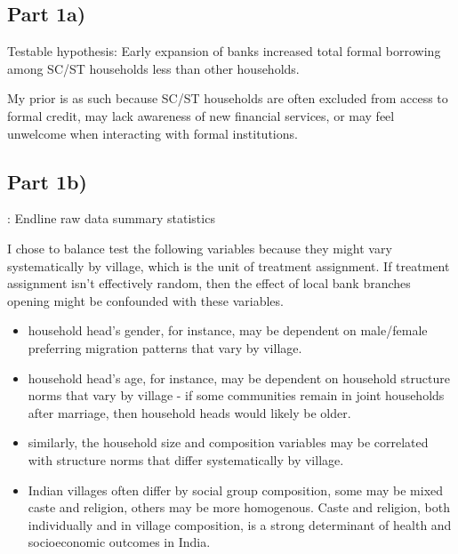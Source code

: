 \documentclass[12pt]{article}
\begin{document}
\subsection*{Part 1a)}

Testable hypothesis: Early expansion of banks increased total formal borrowing among SC/ST households less than other households. 

My prior is as such because SC/ST households are often excluded from access to formal credit, may lack awareness of new financial services, or may feel unwelcome when interacting with formal institutions. 

\subsection*{Part 1b)}

\begin{table}[H]
    \centering
    \scriptsize %
    \setlength{\tabcolsep}{2pt}
    \renewcommand{\arraystretch}{2}
    \resizebox{\textwidth}{!}{}
    \caption{: Endline raw data summary statistics}
\end{table}


I chose to balance test the following variables because they might vary systematically by village, which is the unit of treatment assignment. If treatment assignment isn't effectively random, then the effect of local bank branches opening might be confounded with these variables. 

\begin{itemize}
    \item household head's gender, for instance, may be dependent on male/female preferring migration patterns that vary by village.

    \item household head's age, for instance, may be dependent on household structure norms that vary by village - if some communities remain in joint households after marriage, then household heads would likely be older. 

    \item similarly, the household size and composition variables may be correlated with structure norms that differ systematically by village.
    
    \item Indian villages often differ by social group composition, some may be mixed caste and religion, others may be more homogenous. Caste and religion, both individually and in village composition, is a strong determinant of health and socioeconomic outcomes in India.
    
\end{itemize}
\end{document}
